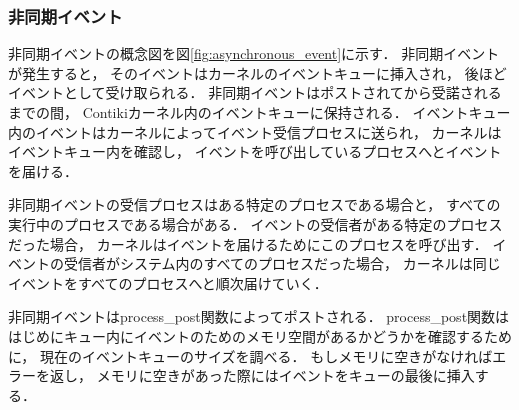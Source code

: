 \subsubsection{非同期イベント}

\vspace{0.5em}非同期イベントの概念図を図\ref{fig:asynchronous_event}に示す．
非同期イベントが発生すると，
そのイベントはカーネルのイベントキューに挿入され，
後ほどイベントとして受け取られる．
非同期イベントはポストされてから受諾されるまでの間，
Contikiカーネル内のイベントキューに保持される．
イベントキュー内のイベントはカーネルによってイベント受信プロセスに送られ，
カーネルはイベントキュー内を確認し，
イベントを呼び出しているプロセスへとイベントを届ける．

非同期イベントの受信プロセスはある特定のプロセスである場合と，
すべての実行中のプロセスである場合がある．
イベントの受信者がある特定のプロセスだった場合，
カーネルはイベントを届けるためにこのプロセスを呼び出す．
イベントの受信者がシステム内のすべてのプロセスだった場合，
カーネルは同じイベントをすべてのプロセスへと順次届けていく．

非同期イベントはprocess\_post関数によってポストされる．
process\_post関数ははじめにキュー内にイベントのためのメモリ空間があるかどうかを確認するために，
現在のイベントキューのサイズを調べる．
もしメモリに空きがなければエラーを返し，
メモリに空きがあった際にはイベントをキューの最後に挿入する．


